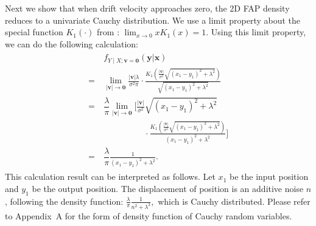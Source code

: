 \documentclass[conference]{IEEEtran}
\theoremstyle{definition}
\theoremstyle{plain}
\begin{document}
Next we show that when drift velocity approaches zero, the 2D FAP density reduces to a univariate Cauchy distribution. 
We use a limit property about the special function $K_1(\cdot)$ from \cite{yang2017approximating}:
$
    \lim_{x\xrightarrow{}0} xK_1(x)=1.
$
Using this limit property, we can do the following calculation:
\begin{align}
\begin{split}
&\ f_{Y \mid X; \mathbf{v}=\mathbf{0}}(\mathbf{y}|\mathbf{x})\\
=&\ 
\lim_{|\mathbf{v}|\xrightarrow{}\mathbf{0}}
\frac{|\mathbf{v}|\lambda}{\sigma^2\pi}
\cdot\frac{K_1\left(\frac{|\mathbf{v}|}{\sigma^2}\sqrt{(x_1-y_1)^2+\lambda^2}\right)}{\sqrt{(x_1-y_1)^2+\lambda^2}}\\
=&\ 
\dfrac{\lambda}{\pi}
\lim_{|\mathbf{v}|\xrightarrow{}\mathbf{0}} \Bigg[
\frac{|\mathbf{v}|}{\sigma^2}\sqrt{(x_1-y_1)^2+\lambda^2}\\ &\quad\quad\quad\quad\quad \cdot\frac{K_1\left(\frac{|\mathbf{v}|}{\sigma^2}\sqrt{(x_1-y_1)^2+\lambda^2}\right)}{(x_1-y_1)^2+\lambda^2}
\Bigg]
\\
=&\ \dfrac{\lambda}{\pi}
\frac{1}{(x_1-y_1)^2+\lambda^2}.
\end{split}
\label{eq:2D-zero}
\end{align}
This calculation result can be interpreted as follows. Let $x_1$ be the input position and $y_1$ be the output position. The displacement of position is an additive noise $n$, following the density function:
$
\frac{\lambda}{\pi}
\frac{1}{n^2+\lambda^2},
$
which is Cauchy distributed. Please refer to Appendix~A for the form of density function of Cauchy random variables.
\end{document}
